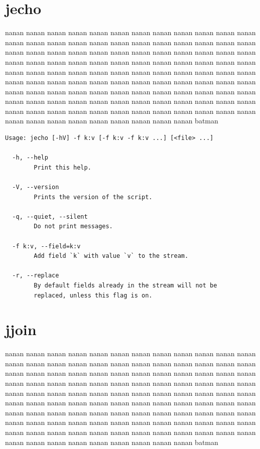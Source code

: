 \documentclass[11pt,a4paper,draft]{report}
\begin{document}
\section{jecho}

nanan nanan nanan nanan nanan nanan nanan nanan nanan nanan nanan nanan nanan
nanan nanan nanan nanan nanan nanan nanan nanan nanan nanan nanan nanan nanan
nanan nanan nanan nanan nanan nanan nanan nanan nanan nanan nanan nanan nanan
nanan nanan nanan nanan nanan nanan nanan nanan nanan nanan nanan nanan nanan
nanan nanan nanan nanan nanan nanan nanan nanan nanan nanan nanan nanan nanan
nanan nanan nanan nanan nanan nanan nanan nanan nanan nanan nanan nanan nanan
nanan nanan nanan nanan nanan nanan nanan nanan nanan nanan nanan nanan nanan
nanan nanan nanan nanan nanan nanan nanan nanan nanan nanan nanan nanan nanan
nanan nanan nanan nanan nanan nanan nanan nanan nanan nanan nanan nanan nanan
batman

{\small
\begin{Verbatim}[samepage=true]
Usage: jecho [-hV] -f k:v [-f k:v -f k:v ...] [<file> ...]

  -h, --help
        Print this help.

  -V, --version
        Prints the version of the script.

  -q, --quiet, --silent
        Do not print messages.

  -f k:v, --field=k:v
        Add field `k` with value `v` to the stream.

  -r, --replace
        By default fields already in the stream will not be
        replaced, unless this flag is on.
\end{Verbatim}
}

\section{jjoin}

nanan nanan nanan nanan nanan nanan nanan nanan nanan nanan nanan nanan nanan
nanan nanan nanan nanan nanan nanan nanan nanan nanan nanan nanan nanan nanan
nanan nanan nanan nanan nanan nanan nanan nanan nanan nanan nanan nanan nanan
nanan nanan nanan nanan nanan nanan nanan nanan nanan nanan nanan nanan nanan
nanan nanan nanan nanan nanan nanan nanan nanan nanan nanan nanan nanan nanan
nanan nanan nanan nanan nanan nanan nanan nanan nanan nanan nanan nanan nanan
nanan nanan nanan nanan nanan nanan nanan nanan nanan nanan nanan nanan nanan
nanan nanan nanan nanan nanan nanan nanan nanan nanan nanan nanan nanan nanan
nanan nanan nanan nanan nanan nanan nanan nanan nanan nanan nanan nanan nanan
batman
\end{document}
